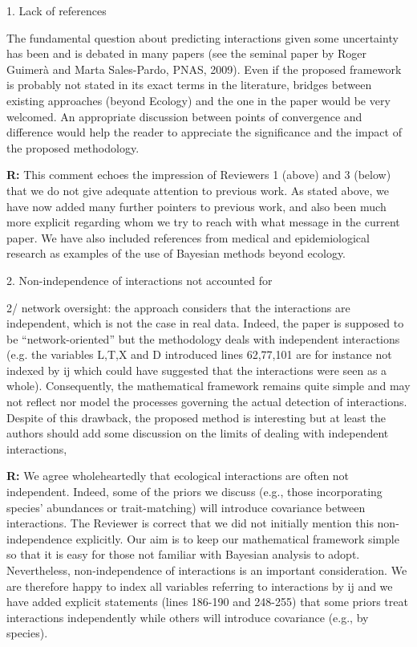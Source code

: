 \documentclass[12pt]{letter}
\newenvironment{refquote}{\bigskip \begin{it}}{\end{it}\smallskip}
\begin{document}
	1. Lack of references 


		\begin{refquote}
			
			The fundamental question about predicting interactions given some uncertainty has been and is debated in many papers (see the seminal paper by Roger Guimer\`{a} and Marta Sales-Pardo, PNAS, 2009). Even if the proposed framework is probably not stated in its exact terms in the literature, bridges between existing approaches (beyond Ecology) and the one in the paper would be very welcomed. An appropriate discussion between points of convergence and difference would help the reader to appreciate the significance and the impact of the proposed methodology.
		
		\end{refquote}


		\textbf{R:} This comment echoes the impression of Reviewers 1 (above) and 3 (below) that we do not give adequate attention to previous work. As stated above, we have now added many further pointers to previous work, and also been much more explicit regarding whom we try to reach with what message in the current paper. We have also included references from medical and epidemiological research as examples of the use of Bayesian methods beyond ecology. 


	2. Non-independence of interactions not accounted for 

		\begin{refquote}
			2/ network oversight: the approach considers that the interactions are independent, which is not the case in real data. Indeed, the paper is supposed to be ``network-oriented'' but the methodology deals with independent interactions (e.g. the variables L,T,X and D introduced lines 62,77,101 are for instance not indexed by ij which could have suggested that the interactions were seen as a whole). Consequently, the mathematical framework remains quite simple and may not reflect nor model the processes governing the actual detection of interactions. Despite of this drawback, the proposed method is interesting but at least the authors should add some discussion on the limits of dealing with independent interactions,
		\end{refquote}


		\textbf{R:} We agree wholeheartedly that ecological interactions are often not independent. Indeed, some of the priors we discuss (e.g., those incorporating species' abundances or trait-matching) will introduce covariance between interactions. The Reviewer is correct that we did not initially mention this non-independence explicitly. Our aim is to keep our mathematical framework simple so that it is easy for those not familiar with Bayesian analysis to adopt. Nevertheless, non-independence of interactions is an important consideration. We are therefore happy to index all variables referring to interactions by ij and we have added explicit statements (lines 186-190 and 248-255) that some priors treat interactions independently while others will introduce covariance (e.g., by species). 
\end{document}
